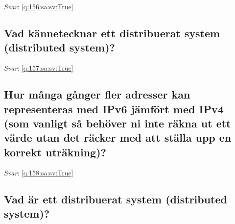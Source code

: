\documentclass[a4paper,11pt,oneside]{article}
\begin{document}
\begin{sloppypar}
\label{q:156:sa:sv:False}

\vspace{2cm}

\noindent\makebox[\textwidth]{\hrulefill}

\vspace{1cm}

\textit{Svar}: \autoref{q:156:sa:sv:True}



\subsection{Vad k\"annetecknar ett distribuerat system (distributed system)?}

\label{q:157:sa:sv:False}

\vspace{2cm}

\noindent\makebox[\textwidth]{\hrulefill}

\vspace{1cm}

\textit{Svar}: \autoref{q:157:sa:sv:True}



\subsection{Hur m\r{a}nga g\r{a}nger fler adresser kan representeras med IPv6 j\"amf\"ort med IPv4 (som vanligt s\r{a} beh\"over ni inte r\"akna ut ett v\"arde utan det r\"acker med att st\"alla upp en korrekt utr\"akning)?}

\label{q:158:sa:sv:False}

\vspace{2cm}

\noindent\makebox[\textwidth]{\hrulefill}

\vspace{1cm}

\textit{Svar}: \autoref{q:158:sa:sv:True}



\subsection{Vad \"ar ett distribuerat system (distributed system)?}

\label{q:159:sa:sv:False}

\vspace{2cm}

\noindent\makebox[\textwidth]{\hrulefill}


\end{sloppypar}
\end{document}
